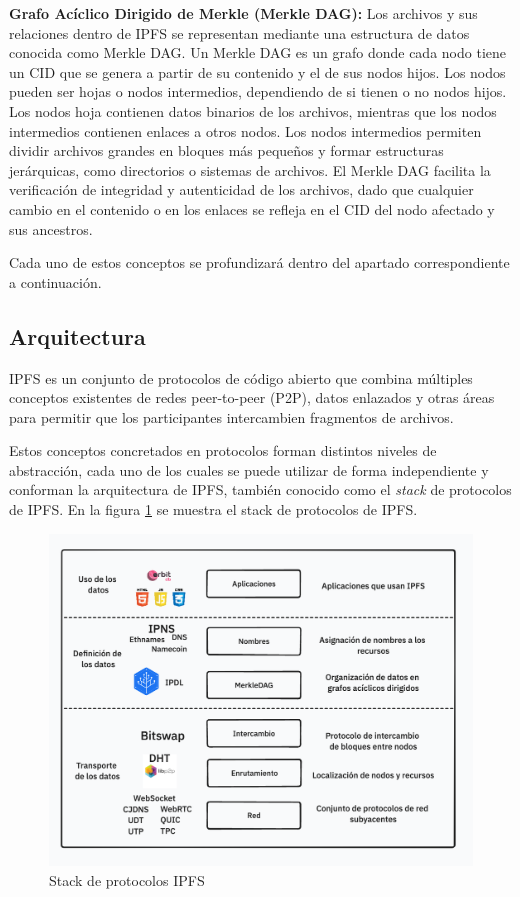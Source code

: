 \textbf{Grafo Acíclico Dirigido de Merkle (Merkle DAG):} Los archivos y sus relaciones dentro de IPFS se representan mediante una estructura de datos conocida como Merkle DAG. Un Merkle DAG es un grafo donde cada nodo tiene un CID que se genera a partir de su contenido y el de sus nodos hijos. Los nodos pueden ser hojas o nodos intermedios, dependiendo de si tienen o no nodos hijos. Los nodos hoja contienen datos binarios de los archivos, mientras que los nodos intermedios contienen enlaces a otros nodos. Los nodos intermedios permiten dividir archivos grandes en bloques más pequeños y formar estructuras jerárquicas, como directorios o sistemas de archivos. El Merkle DAG facilita la verificación de integridad y autenticidad de los archivos, dado que cualquier cambio en el contenido o en los enlaces se refleja en el CID del nodo afectado y sus ancestros.

Cada uno de estos conceptos se profundizará dentro del apartado correspondiente a continuación.

\subsection{Arquitectura}
IPFS es un conjunto de protocolos de código abierto que combina múltiples conceptos existentes de redes
peer-to-peer (P2P), datos enlazados y otras áreas para permitir que los participantes intercambien fragmentos de
archivos.

Estos conceptos concretados en protocolos forman distintos niveles de abstracción, cada uno de los cuales se puede utilizar de forma independiente y conforman la arquitectura de IPFS, también conocido como el \textit{stack} de protocolos de IPFS. En la figura \ref{fig:ipfs} se muestra el stack de protocolos de IPFS.

\begin{figure}[H]
      \centering
      \includegraphics[width=\linewidth]{images/ipfs-stack.png}
      \caption{Stack de protocolos IPFS}
      \label{fig:ipfs}
\end{figure}

